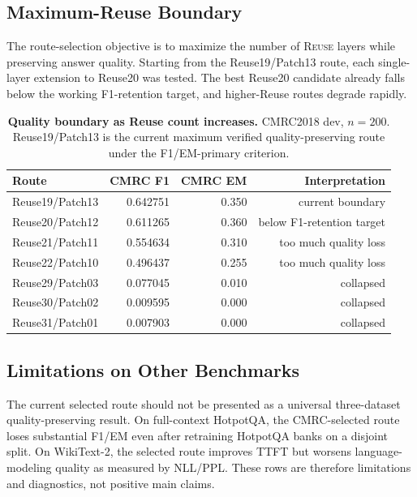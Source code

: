 \subsection{Maximum-Reuse Boundary}
\label{subsec:current_reuse_boundary}

The route-selection objective is to maximize the number of \textsc{Reuse} layers
while preserving answer quality.  Starting from the Reuse19/Patch13 route, each
single-layer extension to Reuse20 was tested.  The best Reuse20 candidate
already falls below the working F1-retention target, and higher-Reuse routes
degrade rapidly.

\begin{table}[t]
  \centering
  \small
  \caption{\textbf{Quality boundary as Reuse count increases.}
  CMRC2018 dev, $n=200$.  Reuse19/Patch13 is the current maximum verified
  quality-preserving route under the F1/EM-primary criterion.}
  \label{tab:current_reuse_boundary}
  \setlength{\tabcolsep}{5pt}
  \begin{tabular}{lrrr}
    \toprule
    \textbf{Route} & \textbf{CMRC F1} & \textbf{CMRC EM} & \textbf{Interpretation} \\
    \midrule
    Reuse19/Patch13 & 0.642751 & 0.350 & current boundary \\
    Reuse20/Patch12 & 0.611265 & 0.360 & below F1-retention target \\
    Reuse21/Patch11 & 0.554634 & 0.310 & too much quality loss \\
    Reuse22/Patch10 & 0.496437 & 0.255 & too much quality loss \\
    Reuse29/Patch03 & 0.077045 & 0.010 & collapsed \\
    Reuse30/Patch02 & 0.009595 & 0.000 & collapsed \\
    Reuse31/Patch01 & 0.007903 & 0.000 & collapsed \\
    \bottomrule
  \end{tabular}
\end{table}

\subsection{Limitations on Other Benchmarks}
\label{subsec:current_limitations}

The current selected route should not be presented as a universal
three-dataset quality-preserving result.  On full-context HotpotQA, the
CMRC-selected route loses substantial F1/EM even after retraining HotpotQA banks
on a disjoint split.  On WikiText-2, the selected route improves TTFT but worsens
language-modeling quality as measured by NLL/PPL.  These rows are therefore
limitations and diagnostics, not positive main claims.

